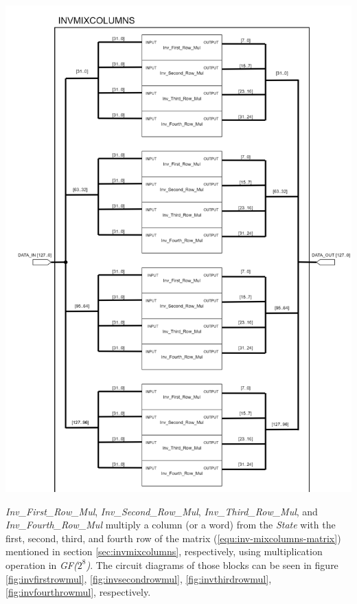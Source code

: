 \documentclass[a4paper, 10pt]{article}
\newenvironment{Figure}
    {\par\medskip\noindent\minipage{\linewidth}}
    {\endminipage\par\medskip}
\begin{document}
\begin{multicols}{2}
	\noindent
            \begin{Figure}
                \centering
                \includegraphics[width=\linewidth]{InvMixColumns-top.png}
                \label{fig:invmixcolumns}
            \end{Figure}

	\textit{Inv\_First\_Row\_Mul}, \textit{Inv\_Second\_Row\_Mul}, \textit{Inv\_Third\_Row\_Mul}, and \textit{Inv\_Fourth\_Row\_Mul} multiply a column (or a word) from the \textit{State} with the first, second, third, and fourth row of the matrix (\ref{equ:inv-mixcolumns-matrix}) mentioned in section \ref{sec:invmixcolumns}, respectively, using multiplication operation in \textit{GF($2^{8}$)}. The circuit diagrams of those blocks can be seen in figure \ref{fig:invfirstrowmul}, \ref{fig:invsecondrowmul}, \ref{fig:invthirdrowmul}, \ref{fig:invfourthrowmul}, respectively.


\end{multicols}
\end{document}
